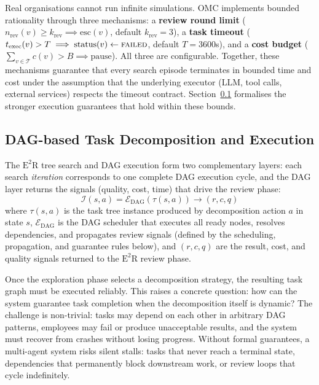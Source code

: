 \documentclass[11pt,a4paper]{article}
\begin{document}
Real organisations cannot run infinite simulations.  OMC implements bounded rationality through three mechanisms: a \textbf{review round limit} ($n_{\text{rev}}(v) \geq k_{\text{rev}} \implies \text{esc}(v)$, default $k_{\text{rev}} = 3$), a \textbf{task timeout} ($t_{\text{exec}}(v) > T \implies \text{status}(v) \leftarrow \textsc{failed}$, default $T = 3600$s), and a \textbf{cost budget} ($\sum_{v \in \mathcal{T}} c(v) > B \implies \text{pause}$).  All three are configurable.  Together, these mechanisms guarantee that every search episode terminates in bounded time and cost under the assumption that the underlying executor (LLM, tool calls, external services) respects the timeout contract.  Section~\ref{sec:dag} formalises the stronger execution guarantees that hold within these bounds.


\subsection{DAG-based Task Decomposition and Execution}
\label{sec:dag}

The $\text{E}^2$R tree search and DAG execution form two complementary layers: each search \emph{iteration} corresponds to one complete DAG execution cycle, and the DAG layer returns the signals (quality, cost, time) that drive the review phase:
\begin{equation}
\mathcal{I}(s, a) = \mathcal{E}_{\text{DAG}}(\tau(s, a)) \to (r, c, q)
\end{equation}
where $\tau(s, a)$ is the task tree instance produced by decomposition action $a$ in state $s$, $\mathcal{E}_{\text{DAG}}$ is the DAG scheduler that executes all ready nodes, resolves dependencies, and propagates review signals (defined by the scheduling, propagation, and guarantee rules below), and $(r, c, q)$ are the result, cost, and quality signals returned to the $\text{E}^2$R review phase.

Once the exploration phase selects a decomposition strategy, the resulting task graph must be executed reliably.  This raises a concrete question: how can the system guarantee task completion when the decomposition itself is dynamic?  The challenge is non-trivial: tasks may depend on each other in arbitrary DAG patterns, employees may fail or produce unacceptable results, and the system must recover from crashes without losing progress. Without formal guarantees, a multi-agent system risks silent stalls: tasks that never reach a terminal state, dependencies that permanently block downstream work, or review loops that cycle indefinitely.
\end{document}
